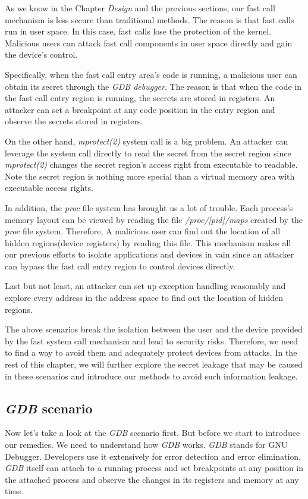 As we know in the Chapter \emph{Design} and the previous sections, our fast call 
mechanism is less secure than traditional methods. The reason is that fast 
calls run in user space. In this case, fast calls lose the protection of the kernel. 
Malicious users can attack fast call components in user space directly and gain the device's control.


Specifically, when the fast call entry area's code is running, a malicious 
user can obtain its secret through the \emph{GDB debugger}\cite{16}. The reason is that when 
the code in the fast call entry region is running, the secrets are stored in 
registers. An attacker can set a breakpoint at any code position in the entry
 region and observe the secrets stored in registers.

On the other hand, \emph{mprotect(2)} system call\cite{19} is a big problem. An attacker 
can leverage the system call directly to read the secret from the secret 
region since \emph{mprotect(2)} changes the secret region's access right from 
executable to readable.  Note the secret region is nothing more special 
than a virtual memory area with executable access rights. 

In addition, the \emph{proc} file system has brought us a lot of trouble. 
Each process's memory layout can be viewed by reading the file \emph{/proc/[pid]/maps} 
created by the \emph{proc} file system. Therefore,  A malicious user can find out the 
location of all hidden regions(device registers) by reading this file. This 
mechanism makes all our previous efforts to isolate applications and devices 
in vain since an attacker can bypass the fast call entry region to control 
devices directly.  

Last but not least, an attacker can set up exception handling reasonably and 
explore every address in the address space to find out the location of hidden 
regions. 

The above scenarios break the isolation between the user and the device 
provided by the fast system call mechanism and lead to security risks. 
Therefore, we need to find a way to avoid them and adequately protect 
devices from attacks. In the rest of this chapter, we will further 
explore the secret leakage that may be caused in these scenarios and 
introduce our methods to avoid such information leakage.

\subsection{\emph{GDB} scenario}
Now let's take a look at the \emph{GDB} scenario first. 
But before we start to introduce our remedies. We need to understand 
how \emph{GDB} works. \emph{GDB} stands for GNU Debugger. Developers use it extensively for error 
detection and error elimination. \emph{GDB} itself can attach to a running 
process and set breakpoints at any position in the attached process 
and observe the changes in its registers and memory at any time. 


